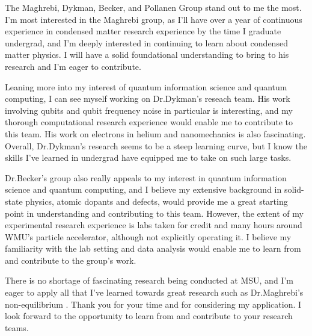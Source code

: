 \documentclass[11pt]{article}
\newcommand{\schoolabbr}{MSU}
\begin{document}
The Maghrebi, Dykman, Becker, and Pollanen Group stand out to me the most. I'm most interested in the Maghrebi group, as I'll have over a year of continuous experience in condensed matter research experience by the time I graduate undergrad, and I'm deeply interested in continuing to learn about condensed matter physics. I will have a solid foundational understanding to bring to his research and I'm eager to contribute.

Leaning more into my interest of quantum information science and quantum computing, I can see myself working on Dr.\@ Dykman's reseach team. His work involving qubits and qubit frequency noise in particular is interesting, and my thorough computational research experience would enable me to contribute to this team. His work on electrons in helium and nanomechanics is also fascinating. Overall, Dr.\@ Dykman's research seems to be a steep learning curve, but I know the skills I've learned in undergrad have equipped me to take on such large tasks.

Dr.\@ Becker's group also really appeals to my interest in quantum information science and quantum computing, and I believe my extensive background in solid-state physics, atomic dopants and defects, would provide me a great starting point in understanding and contributing to this team. However, the extent of my experimental research experience is labs taken for credit and many hours around WMU's particle accelerator, although not explicitly operating it. I believe my familiarity with the lab setting and data analysis would enable me to learn from and contribute to the group's work. 

There is no shortage of fascinating research being conducted at \schoolabbr{}, and I'm eager to apply all that I've learned towards great research such as Dr.\@ Maghrebi's non-equilibrium . Thank you for your time and for considering my application. I look forward to the opportunity to learn from and contribute to your research teams.
\end{document}
